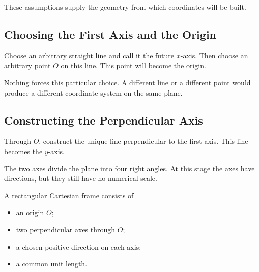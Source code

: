 These assumptions supply the geometry from which coordinates will be built.

\subsection{Choosing the First Axis and the Origin}

Choose an arbitrary straight line and call it the future $x$-axis.  Then choose
an arbitrary point $O$ on this line.  This point will become the origin.

\begin{center}
\end{center}

Nothing forces this particular choice.  A different line or a different point
would produce a different coordinate system on the same plane.

\subsection{Constructing the Perpendicular Axis}

Through $O$, construct the unique line perpendicular to the first axis.  This
line becomes the $y$-axis.

\begin{center}
\end{center}

The two axes divide the plane into four right angles.  At this stage the axes
have directions, but they still have no numerical scale.

\begin{definitionbox}
A rectangular Cartesian frame consists of
\begin{itemize}
    \item an origin $O$;
    \item two perpendicular axes through $O$;
    \item a chosen positive direction on each axis;
    \item a common unit length.
\end{itemize}
\end{definitionbox}

